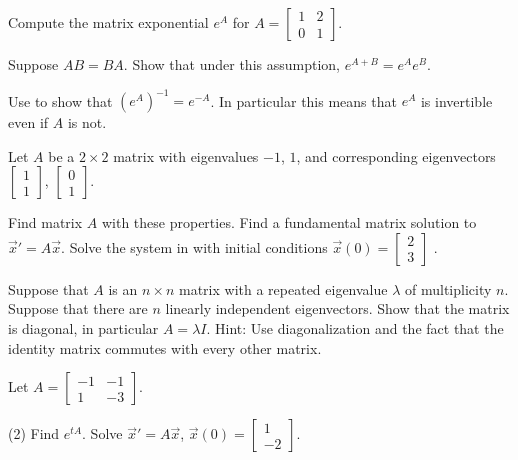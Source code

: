 \begin{exercise}
Compute the matrix exponential $e^A$ for
$A = \left[ \begin{smallmatrix} 1 & 2 \\ 0 & 1 \end{smallmatrix} \right]$.
\end{exercise}

\begin{exercise}[challenging] \label{matexp:explawex}
Suppose $AB = BA$.  Show that under this assumption, $e^{A+B} = e^A e^B$.
\end{exercise}

\begin{exercise} \label{matexp:expinvex}
Use 
to show that ${(e^{A})}^{-1} = e^{-A}$.  In particular
this means that $e^A$ is invertible even if $A$ is not.
\end{exercise}

\begin{exercise}
Let $A$ be a $2 \times 2$ matrix with eigenvalues $-1$, $1$, and
corresponding eigenvectors
$\left[ \begin{smallmatrix}
1 \\
1
\end{smallmatrix} \right]$,
$\left[ \begin{smallmatrix}
0 \\
1
\end{smallmatrix} \right]$.
\begin{tasks}
\task Find matrix $A$ with these properties.
\task Find a fundamental matrix solution to ${\vec{x}}' = A \vec{x}$.
\task Solve the system in with initial conditions $\vec{x}(0) =
\left[ \begin{smallmatrix}
2 \\
3
\end{smallmatrix} \right]$ .
\end{tasks}
\end{exercise}

\begin{exercise}
Suppose that $A$ is an $n \times n$ matrix with a repeated eigenvalue
$\lambda$ of multiplicity $n$.
Suppose that there are $n$ linearly independent eigenvectors.  Show that
the matrix is diagonal, in particular $A = \lambda I$.  Hint: Use
diagonalization and the fact that the identity matrix commutes with every
other matrix.
\end{exercise}

\begin{exercise}
Let $A = \left[ \begin{smallmatrix}
-1 & -1 \\
1 & -3
\end{smallmatrix} \right]$.
\begin{tasks}(2)
\task Find $e^{tA}$.
\task Solve
${\vec{x}}' = A \vec{x}$, $\vec{x}(0) =
\left[ \begin{smallmatrix}
1 \\
-2
\end{smallmatrix} \right]$.
\end{tasks}
\end{exercise}

